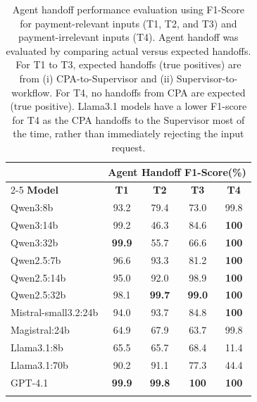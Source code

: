 \documentclass[runningheads]{llncs}
\begin{document}
\begin{table}[!h]
 \centering
 \renewcommand{\arraystretch}{1.0}
 \setlength{\tabcolsep}{2.5mm}
     \begin{tabular}{l c c c c}
         \toprule
         & \multicolumn{4}{c}{\textbf{Agent Handoff F1-Score(\%)}} \\
         \cmidrule(lr){2-5} 
         \textbf{Model} & \textbf{T1} & \textbf{T2} & \textbf{T3} & \textbf{T4}\\
         \midrule
         Qwen3:8b & 93.2 & 79.4 & 73.0 & 99.8 \\
         Qwen3:14b & 99.2 & 46.3 & 84.6 & \textbf{100} \\
         Qwen3:32b & \textbf{99.9} & 55.7 & 66.6 & \textbf{100} \\
         \addlinespace[2pt]
         Qwen2.5:7b & 96.6 & 93.3 & 81.2 & \textbf{100} \\
         Qwen2.5:14b & 95.0 & 92.0 & 98.9 & \textbf{100} \\
         Qwen2.5:32b & 98.1 & \textbf{99.7} & \textbf{99.0} & \textbf{100} \\
         
         \addlinespace[2pt]
         Mistral-small3.2:24b & 94.0 & 93.7 & 84.8 & \textbf{100} \\
         Magistral:24b & 64.9 & 67.9 & 63.7 & 99.8 \\
         \addlinespace[2pt]
         Llama3.1:8b & 65.5 & 65.7 & 68.4 & 11.4 \\
         Llama3.1:70b & 90.2 & 91.1 & 77.3 & 44.4 \\
         
         \addlinespace[2pt]
         \midrule
         GPT-4.1 & \textbf{99.9} & \textbf{99.8} & \textbf{100} & \textbf{100} \\
         \addlinespace[2pt]
         \bottomrule
         \\
         \end{tabular}
         \caption{Agent handoff performance evaluation using F1-Score for payment-relevant inputs (T1, T2, and T3) and payment-irrelevant inputs (T4). Agent handoff was evaluated by comparing actual versus expected handoffs. For T1 to T3, expected handoffs (true positives) are from (i) CPA-to-Supervisor and (ii) Supervisor-to-workflow. For T4, no handoffs from CPA are expected (true positive). Llama3.1 models have a lower F1-score for T4 as the CPA handoffs to the Supervisor most of the time, rather than immediately rejecting the input request.}
     \label{tab:eval_tool_call}
\end{table}
\end{document}
